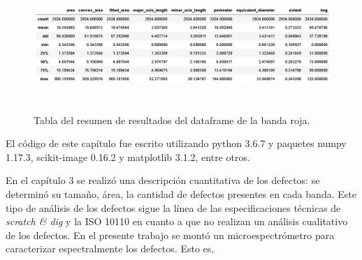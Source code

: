 \begin{figure}[H]
	\centering
	\includegraphics[width=1.0\textwidth,height= 5.0cm]{Figs/resultados_defectos/tabla_roja.png}
	\caption{Tabla del resumen de resultados del dataframe de la banda roja.}
	\label{fig:bgcel}
\end{figure}






El código de este capítulo fue escrito utilizando python 3.6.7 y paquetes numpy 1.17.3, scikit-image 0.16.2 y matplotlib 3.1.2, entre otros.

En el capítulo 3 se realizó una descripción cuantitativa de los defectos: se determinó su tamaño, área, la cantidad de defectos presentes en cada banda. Este tipo de análisis de los defectos sigue la línea de las especificaciones técnicas de \textit{scratch \& dig} y la ISO 10110 en cuanto a que no realizan un análisis cualitativo de los defectos. En el presente trabajo se montó un microespectrómetro para caracterizar espectralmente los defectos. Esto es,


\vspace{1cm}
\vspace{1cm}


\vspace{1cm}
\vspace{1cm}

\vspace{1cm}
\vspace{1cm}

\vspace{1cm}
\vspace{1cm}